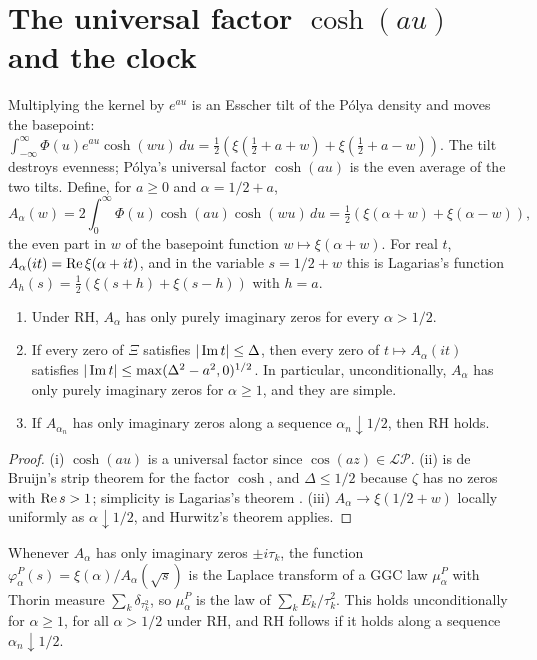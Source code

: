 \section{The universal factor $\cosh(au)$ and the clock}\label{pol:sec:cosh}

Multiplying the kernel by $e^{au}$ is an Esscher tilt of the P\'olya density and moves the basepoint: $\int_{-\infty}^{\infty}\Phi(u)e^{au}\cosh(wu)\,du=\frac12\left(\xi(\tfrac12+a+w)+\xi(\tfrac12+a-w)\right)$. The tilt destroys evenness; P\'olya's universal factor $\cosh(au)$ is the even average of the two tilts. Define, for $a\ge0$ and $\alpha=1/2+a$,
\begin{equation}\label{pol:eq:A}
A_\alpha(w)=2\int_0^\infty\Phi(u)\cosh(au)\cosh(wu)\,du=\tfrac12\left(\xi(\alpha+w)+\xi(\alpha-w)\right),
\end{equation}
the even part in $w$ of the basepoint function $w\mapsto\xi(\alpha+w)$. For real $t$, $A_\alpha(it)=\operatorname{Re}\xi(\alpha+it)$, and in the variable $s=1/2+w$ this is Lagarias's function $A_h(s)=\frac12(\xi(s+h)+\xi(s-h))$ with $h=a$.

\begin{theorem}\label{pol:thm:cosh}
\begin{enumerate}
\item[(i)] Under RH, $A_\alpha$ has only purely imaginary zeros for every $\alpha>1/2$.
\item[(ii)] If every zero of $\Xi$ satisfies $|\operatorname{Im} t|\le\Delta$, then every zero of $t\mapsto A_\alpha(it)$ satisfies $|\operatorname{Im} t|\le\max(\Delta^2-a^2,0)^{1/2}$. In particular, unconditionally, $A_\alpha$ has only purely imaginary zeros for $\alpha\ge1$, and they are simple.
\item[(iii)] If $A_{\alpha_n}$ has only imaginary zeros along a sequence $\alpha_n\downarrow1/2$, then RH holds.
\end{enumerate}
\end{theorem}

\begin{proof}
(i) $\cosh(au)$ is a universal factor since $\cos(az)\in\mathcal{LP}$. (ii) is de Bruijn's strip theorem for the factor $\cosh$, and $\Delta\le1/2$ because $\zeta$ has no zeros with $\operatorname{Re} s>1$; simplicity is Lagarias's theorem \cite{Lagarias05}. (iii) $A_\alpha\to\xi(1/2+w)$ locally uniformly as $\alpha\downarrow1/2$, and Hurwitz's theorem applies.
\end{proof}

\begin{corollary}\label{pol:cor:evenpart}
Whenever $A_\alpha$ has only imaginary zeros $\pm i\tau_k$, the function $\varphi^P_\alpha(s)=\xi(\alpha)/A_\alpha(\sqrt s)$ is the Laplace transform of a GGC law $\mu^P_\alpha$ with Thorin measure $\sum_k\delta_{\tau_k^2}$, so $\mu^P_\alpha$ is the law of $\sum_kE_k/\tau_k^2$. This holds unconditionally for $\alpha\ge1$, for all $\alpha>1/2$ under RH, and RH follows if it holds along a sequence $\alpha_n\downarrow1/2$.
\end{corollary}

